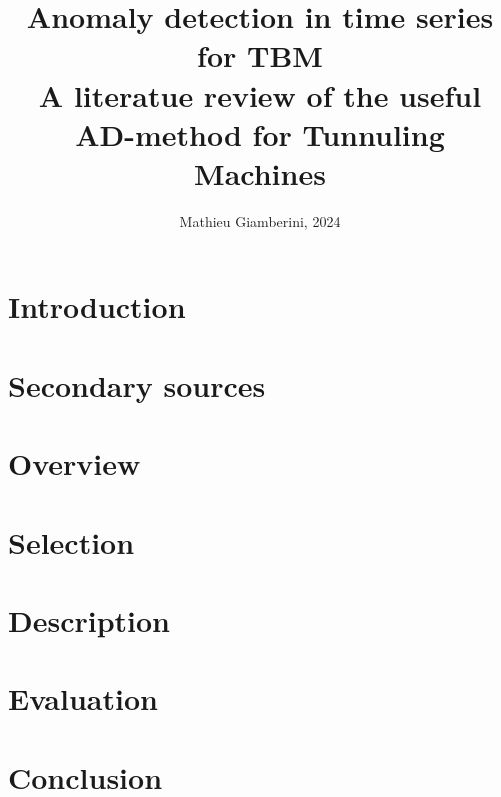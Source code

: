 \documentclass{article}
\title{Anomaly detection in time series for TBM \\ \small{A literatue review of the useful AD-method for Tunnuling Machines}}
\author{Mathieu Giamberini, 2024}
\date{}
\begin{document}
    \maketitle
    \begin{abstract}
        
    \end{abstract}
    
    \section*{Introduction}
        

    \section{Secondary sources}
        

    \section{Overview}
        

    \section{Selection}
        

    \section{Description}
        

    \section{Evaluation}%
        

    \section*{Conclusion}
        
\end{document}
